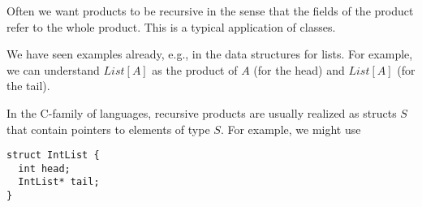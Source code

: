 Often we want products to be recursive in the sense that the fields of the product refer to the whole product.
This is a typical application of classes.

We have seen examples already, e.g., in the data structures for lists.
For example, we can understand $List[A]$ as the product of $A$ (for the head) and $List[A]$ (for the tail).

In the C-family of languages, recursive products are usually realized as structs $S$ that contain pointers to elements of type $S$.
For example, we might use
\begin{lstlisting}
struct IntList {
  int head;
  IntList* tail;
}
\end{lstlisting}
